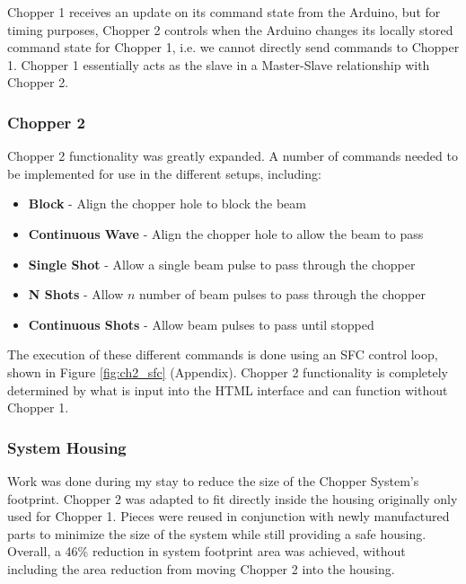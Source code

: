 \documentclass{article}
\begin{document}
            \noindent Chopper 1 receives an update on its command state from the Arduino, but for timing purposes, Chopper 2 controls when the Arduino changes its locally stored command state for Chopper 1, i.e. we cannot directly send commands to Chopper 1. Chopper 1 essentially acts as the slave in a Master-Slave relationship with Chopper 2.
            
        \subsubsection{Chopper 2}
        
            Chopper 2 functionality was greatly expanded. A number of commands needed to be implemented for use in the different setups, including:
            
            \begin{itemize}
                \item \textbf{Block} - Align the chopper hole to block the beam
                \item \textbf{Continuous Wave} - Align the chopper hole to allow the beam to pass
                \item \textbf{Single Shot} - Allow a single beam  pulse to pass through the chopper
                \item \textbf{N Shots} - Allow $n$ number of beam pulses to pass through the chopper
                \item \textbf{Continuous Shots} - Allow beam pulses to pass until stopped
            \end{itemize}
            
            \noindent The execution of these different commands is done using an SFC control loop, shown in Figure \ref{fig:ch2_sfc} (Appendix). Chopper 2 functionality is completely determined by what is input into the HTML interface and can function without Chopper 1.
            
        \subsubsection{System Housing}
        
            Work was done during my stay to reduce the size of the Chopper System's footprint. Chopper 2 was adapted to fit directly inside the housing originally only used for Chopper 1. Pieces were reused in conjunction with newly manufactured parts to minimize the size of the system while still providing a safe housing. Overall, a 46\% reduction in system footprint area was achieved, without including the area reduction from moving Chopper 2 into the housing.
            
\end{document}
